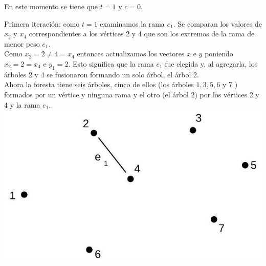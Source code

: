 \documentclass[10pt]{article}
\begin{document}
En este momento se tiene que $t=1$ y $c=0$.

Primera iteración: como $t=1$ examinamos la rama $e_{1}$. Se comparan los valores de $x_{2}$ y $x_{4}$ correspondientes a los vértices 2 y 4 que son los extremos de la rama de menor peso $e_{1}$.\\
Como $x_{2}=2 \neq 4=x_{4}$ entonces actualizamos los vectores $x$ e $y$ poniendo $x_{2}=2=x_{4}$ e $y_{1}=2$. Esto significa que la rama $e_{1}$ fue elegida y, al agregarla, los árboles 2 y 4 se fusionaron formando un solo árbol, el árbol 2.\\
Ahora la foresta tiene seis árboles, cinco de ellos (los árboles $1,3,5,6$ y 7 ) formados por un vértice y ninguna rama y el otro (el árbol 2) por los vértices 2 y 4 y la rama $e_{1}$.\\
\includegraphics[max width=\textwidth, center]{2025_09_05_93c7c1835f249f70c0eeg-23}
\end{document}
